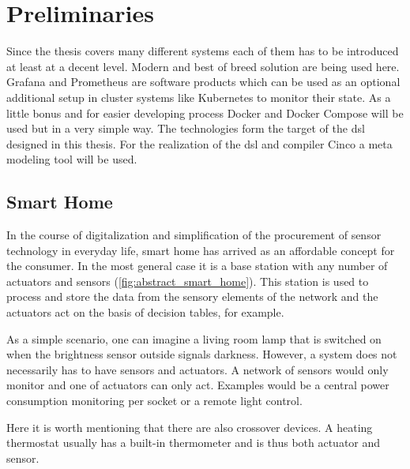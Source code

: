 \chapter{Preliminaries}
\label{chapter:grundlagen}

Since the thesis covers many different systems each of them has to be introduced at least at a decent level. Modern and best of breed solution are being used here. Grafana and Prometheus are software products which can be used as an optional additional setup in cluster systems like Kubernetes to monitor their state. As a little bonus and for easier developing process Docker and Docker Compose will be used but in a very simple way. The technologies form the target of the \gls{dsl} designed in this thesis. For the realization of the \gls{dsl} and compiler Cinco a meta modeling tool will be used.
 
\section{Smart Home}

In the course of digitalization and simplification of the procurement of sensor technology in everyday life, smart home has arrived as an affordable concept for the consumer. In the most general case it is a base station with any number of actuators and sensors (\cref{fig:abstract_smart_home}). This station is used to process and store the data from the sensory elements of the network and the actuators act on the basis of decision tables, for example. 

As a simple scenario, one can imagine a living room lamp that is switched on when the brightness sensor outside signals darkness. However, a system does not necessarily has to have sensors and actuators. A network of sensors would only monitor and one of actuators can only act. Examples would be a central power consumption monitoring per socket or a remote light control.

Here it is worth mentioning that there are also crossover devices. A heating thermostat usually has a built-in thermometer and is thus both actuator and sensor.

